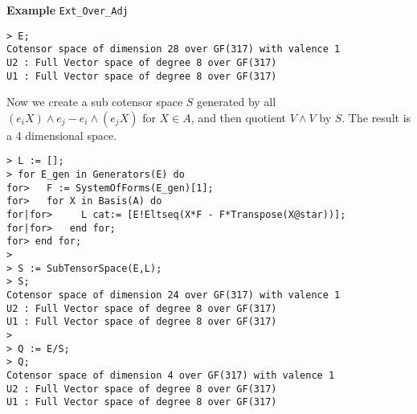 \begin{framed} {\bf Example} {\tt Ext\_Over\_Adj}
{\begin{lstlisting}[frame=single,basicstyle=\ttfamily\color{black!30!
teal},backgroundcolor=\color{white!70!gray}]
> E;
Cotensor space of dimension 28 over GF(317) with valence 1
U2 : Full Vector space of degree 8 over GF(317)
U1 : Full Vector space of degree 8 over GF(317)
\end{lstlisting}
Now we create a sub cotensor space $S$ generated by all $(e_iX)\wedge e_j - e_i\wedge (e_jX)$ for $X\in A$, 
and then quotient $V\wedge V$ by $S$. The result is a 4 dimensional space.
\begin{lstlisting}[frame=single,basicstyle=\ttfamily\color{black!30!
teal},backgroundcolor=\color{white!70!gray}]
> L := [];
> for E_gen in Generators(E) do
for>   F := SystemOfForms(E_gen)[1];
for>   for X in Basis(A) do
for|for>     L cat:= [E!Eltseq(X*F - F*Transpose(X@star))];
for|for>   end for;
for> end for;
> 
> S := SubTensorSpace(E,L);
> S;
Cotensor space of dimension 24 over GF(317) with valence 1
U2 : Full Vector space of degree 8 over GF(317)
U1 : Full Vector space of degree 8 over GF(317)
> 
> Q := E/S;
> Q;
Cotensor space of dimension 4 over GF(317) with valence 1
U2 : Full Vector space of degree 8 over GF(317)
U1 : Full Vector space of degree 8 over GF(317)
\end{lstlisting}
}
\end{framed}
